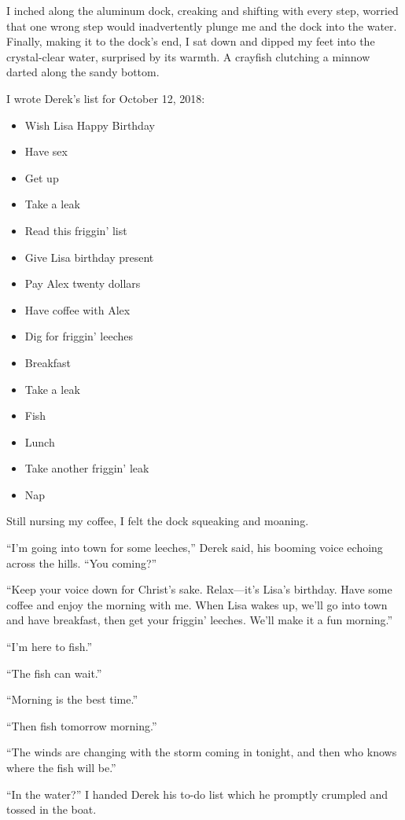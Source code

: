 I inched along the aluminum dock, creaking and shifting with every step,
worried that one wrong step would inadvertently plunge me and the dock
into the water. Finally, making it to the dock's end, I sat down and
dipped my feet into the crystal-clear water, surprised by its warmth. A
crayfish clutching a minnow darted along the sandy bottom.

I wrote Derek's list for October 12, 2018:

\begin{itemize}
\tightlist
\item
  Wish Lisa Happy Birthday
\item
  Have sex
\item
  Get up
\item
  Take a leak
\item
  Read this friggin' list
\item
  Give Lisa birthday present
\item
  Pay Alex twenty dollars
\item
  Have coffee with Alex
\item
  Dig for friggin' leeches
\item
  Breakfast
\item
  Take a leak
\item
  Fish
\item
  Lunch
\item
  Take another friggin' leak
\item
  Nap
\end{itemize}

Still nursing my coffee, I felt the dock squeaking and moaning.

``I'm going into town for some leeches,'' Derek said, his booming voice
echoing across the hills. ``You coming?''

``Keep your voice down for Christ's sake. Relax---it's Lisa's birthday.
Have some coffee and enjoy the morning with me. When Lisa wakes up,
we'll go into town and have breakfast, then get your friggin' leeches.
We'll make it a fun morning.''

``I'm here to fish.''

``The fish can wait.''

``Morning is the best time.''

``Then fish tomorrow morning.''

``The winds are changing with the storm coming in tonight, and then who
knows where the fish will be.''

``In the water?'' I handed Derek his to-do list which he promptly
crumpled and tossed in the boat.

